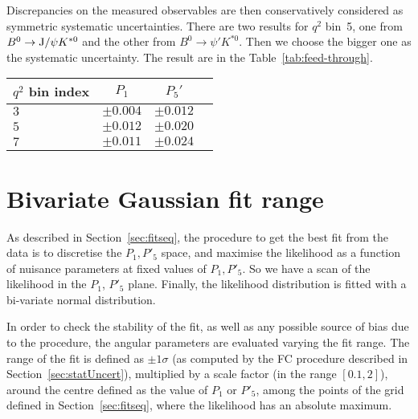 Discrepancies on the measured observables are then conservatively considered as symmetric systematic uncertainties.
There are two results for $q^2$ bin~5, one from $B^0 \to {\rm J/}\psi K^{*0}$ and the other from $B^0 \to \psi' K^{*0}$.
Then we choose the bigger one as the systematic uncertainty.
The result are in the Table~\ref{tab:feed-through}.

\begin{table*}[!htb]
  \begin {center}
    \begin{small}
      \caption{Systematic uncertainties from the feed through backgrounds.
        \label{tab:feed-through}}
      \begin{tabular}{l|c|c|c}
        $q^2$ bin index & $P_1$ & $P_5'$ \\
        \hline
        $3$ & $\pm 0.004$ & $\pm 0.012$ \\
        $5$ & $\pm 0.012$ & $\pm 0.020$ \\
        $7$ & $\pm 0.011$ & $\pm 0.024$ \\
      \end{tabular}
    \end{small}
  \end{center}
\end{table*}

\section{Bivariate Gaussian fit range}\label{sec:bestFit}

As described in Section~\ref{sec:fitseq}, the procedure to get the best fit from the data is to discretise the $P_1,P'_5$ space, and maximise the likelihood as a function of nuisance parameters at fixed values of $P_1,P'_5$.
So we have a scan of the likelihood in the $P_1$, $P'_5$ plane.
Finally, the likelihood distribution is fitted with a bi-variate normal distribution.

In order to check the stability of the fit, as well as any possible source of bias due to the procedure, the angular parameters are evaluated varying the fit range.
The range of the fit is defined as $\pm1\sigma$ (as computed by the FC procedure described in Section~\ref{sec:statUncert}), multiplied by a scale factor (in the range $[0.1,2]$), around the centre defined as the value of $P_1$ or $P'_5$, among the points of the grid defined in Section~\ref{sec:fitseq}, where the likelihood has an absolute maximum.

